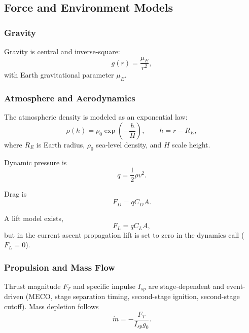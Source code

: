 \subsection{Force and Environment Models}

\subsubsection{Gravity}

Gravity is central and inverse-square:
\begin{equation}
 g(r) = \frac{\mu_E}{r^2},
\end{equation}
with Earth gravitational parameter $\mu_E$.

\subsubsection{Atmosphere and Aerodynamics}

The atmospheric density is modeled as an exponential law:
\begin{equation}
 \rho(h) = \rho_0 \exp\!\left(-\frac{h}{H}\right),
 \qquad h = r - R_E,
\end{equation}
where $R_E$ is Earth radius, $\rho_0$ sea-level density, and $H$ scale height.

Dynamic pressure is
\begin{equation}
 q = \frac{1}{2}\rho v^2.
\end{equation}

Drag is
\begin{equation}
 F_D = q C_D A.
\end{equation}

A lift model exists,
\begin{equation}
 F_L = q C_L A,
\end{equation}
but in the current ascent propagation lift is set to zero in the dynamics call ($F_L=0$).

\subsubsection{Propulsion and Mass Flow}

Thrust magnitude $F_T$ and specific impulse $I_{sp}$ are stage-dependent and event-driven (MECO, stage separation timing, second-stage ignition, second-stage cutoff). Mass depletion follows
\begin{equation}
 \dot{m} = -\frac{F_T}{I_{sp} g_0}.
\end{equation}

